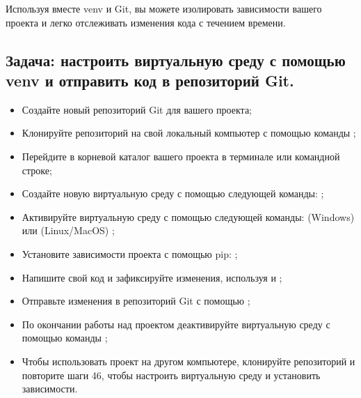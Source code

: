 \documentclass[letterpaper,10pt,russian]{sphinxmanual}
\begin{document}
\sphinxAtStartPar
Используя вместе venv и Git, вы можете изолировать зависимости вашего проекта и легко отслеживать изменения кода с течением времени.


\subsection{Задача: настроить виртуальную среду с помощью venv и отправить код в репозиторий Git.}
\label{\detokenize{educational_materials/path_venv/exercises:id4}}\begin{itemize}
\item {} 
\sphinxAtStartPar
Создайте новый репозиторий Git для вашего проекта;

\item {} 
\sphinxAtStartPar
Клонируйте репозиторий на свой локальный компьютер с помощью команды ;

\item {} 
\sphinxAtStartPar
Перейдите в корневой каталог вашего проекта в терминале или командной строке;

\item {} 
\sphinxAtStartPar
Создайте новую виртуальную среду с помощью следующей команды: ;

\item {} 
\sphinxAtStartPar
Активируйте виртуальную среду с помощью следующей команды: (Windows)  или (Linux/MacOS) ;

\item {} 
\sphinxAtStartPar
Установите зависимости проекта с помощью pip: ;

\item {} 
\sphinxAtStartPar
Напишите свой код и зафиксируйте изменения, используя  и ;

\item {} 
\sphinxAtStartPar
Отправьте изменения в репозиторий Git с помощью ;

\item {} 
\sphinxAtStartPar
По окончании работы над проектом деактивируйте виртуальную среду с помощью команды ;

\item {} 
\sphinxAtStartPar
Чтобы использовать проект на другом компьютере, клонируйте репозиторий и повторите шаги 4\textendash{}6, чтобы настроить виртуальную среду и установить зависимости.

\end{itemize}
\end{document}
